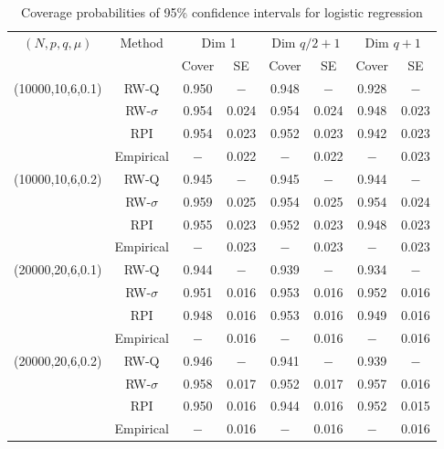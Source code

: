 \documentclass[twoside,11pt]{article}
\begin{document}
\begin{table}[!h]
	\centering
	\caption{Coverage probabilities of 95\% confidence intervals for logistic regression}
	\medskip
	\label{tab:sim2}
	\begin{tabular}{cccccccc}
		\hline
		$(N, p, q, \mu)$ & Method & \multicolumn{2}{c}{Dim 1} & \multicolumn{2}{c}{Dim $q/2+1$} & \multicolumn{2}{c}{Dim $q+1$}\\
		& & Cover& SE& Cover& SE & Cover& SE\\
		\hline
		\hline
		(10000,10,6,0.1) & RW-Q & 0.950&$-$ &0.948 &$-$ &0.928&$-$\\
		& RW-$\sigma$ & 0.954&0.024 & 0.954&0.024 &0.948& 0.023\\
		& RPI & 0.954& 0.023& 0.952&0.023 &0.942 &0.023\\
		& Empirical & $-$& 0.022&$-$ & 0.022&$-$& 0.023\\
		\hline
		(10000,10,6,0.2) & RW-Q & 0.945&$-$ &0.945 &$-$ &0.944 &$-$\\
		& RW-$\sigma$ & 0.959& 0.025& 0.954& 0.025&0.954&0.024\\
		& RPI & 0.955&0.023 & 0.952& 0.023&0.948& 0.023\\
		& Empirical & $-$& 0.023&$-$ & 0.023&$-$& 0.023\\
		\hline
		(20000,20,6,0.1) & RW-Q & 0.944&$-$ & 0.939&$-$ &0.934&$-$\\
		& RW-$\sigma$ & 0.951& 0.016&0.953 &0.016 &0.952& 0.016\\
		& RPI & 0.948&0.016 &0.953& 0.016&0.949& 0.016\\
		& Empirical & $-$& 0.016&$-$ & 0.016&$-$& 0.016\\
		\hline
		(20000,20,6,0.2) & RW-Q & 0.946&$-$ &0.941 & $-$&0.939&$-$\\
		& RW-$\sigma$ & 0.958& 0.017& 0.952 & 0.017&0.957 & 0.016\\
		& RPI &0.950 & 0.016&0.944 &0.016 &0.952 & 0.015\\
		& Empirical & $-$& 0.016&$-$ & 0.016&$-$& 0.016\\
		\hline
	\end{tabular}
\end{table}
\end{document}
